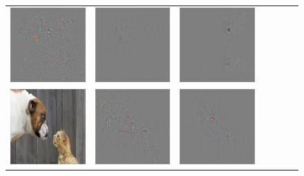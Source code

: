 \begin{figure}
\begin{center}
\begin{tabular}{ccccccc}
\includegraphics[width=0.14\linewidth,height=0.115\linewidth]{figs/examples/googlenet/oxford/dog-cat2_diff_286} &
\includegraphics[width=0.14\linewidth,height=0.115\linewidth]{figs/examples/googlenet/deconv/dog-cat2_diff_286} &
\includegraphics[width=0.14\linewidth,height=0.115\linewidth]{figs/examples/googlenet/soft/dog-cat2_diff_286} \\
\vspace{-2.5pt}
\includegraphics[width=0.14\linewidth,height=0.115\linewidth]{figs/examples/googlenet/oxford/dog-cat4} &
\includegraphics[width=0.14\linewidth,height=0.115\linewidth]{figs/examples/googlenet/oxford/dog-cat4_diff_243} &
\includegraphics[width=0.14\linewidth,height=0.115\linewidth]{figs/examples/googlenet/deconv/dog-cat4_diff_243} &

\end{tabular}
\end{center}
\end{figure}
